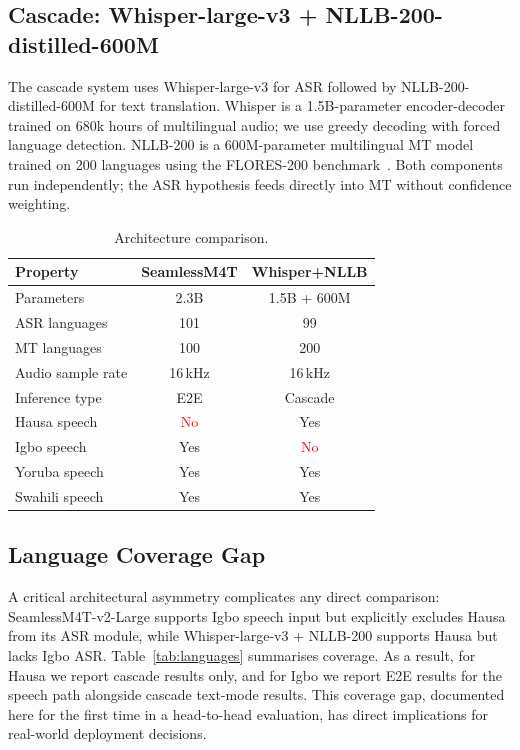 \documentclass[11pt,a4paper]{article}
\newcommand{\modelSM}{SeamlessM4T-v2-Large}
\newcommand{\modelWN}{Whisper-large-v3 + NLLB-200}
\begin{document}
\subsection{Cascade: Whisper-large-v3 + NLLB-200-distilled-600M}
The cascade system uses Whisper-large-v3 for ASR followed by NLLB-200-distilled-600M for text translation. Whisper is a 1.5B-parameter encoder-decoder trained on 680k hours of multilingual audio; we use greedy decoding with forced language detection. NLLB-200 is a 600M-parameter multilingual MT model trained on 200 languages using the FLORES-200 benchmark~\citep{costa-jussa-etal-2022-no}. Both components run independently; the ASR hypothesis feeds directly into MT without confidence weighting.

\begin{table}[t]
\centering
\small
\caption{Architecture comparison.}
\label{tab:arch}
\begin{tabular}{lcc}
\toprule
\textbf{Property} & \textbf{SeamlessM4T} & \textbf{Whisper+NLLB} \\
\midrule
Parameters & 2.3B & 1.5B + 600M \\
ASR languages & 101 & 99 \\
MT languages & 100 & 200 \\
Audio sample rate & 16\,kHz & 16\,kHz \\
Inference type & E2E & Cascade \\
\midrule
Hausa speech & \textcolor{red}{No} & \textcolor{green!60!black}{Yes} \\
Igbo speech & \textcolor{green!60!black}{Yes} & \textcolor{red}{No} \\
Yoruba speech & \textcolor{green!60!black}{Yes} & \textcolor{green!60!black}{Yes} \\
Swahili speech & \textcolor{green!60!black}{Yes} & \textcolor{green!60!black}{Yes} \\
\bottomrule
\end{tabular}
\end{table}

\subsection{Language Coverage Gap}
A critical architectural asymmetry complicates any direct comparison: \modelSM{} supports Igbo speech input but explicitly excludes Hausa from its ASR module, while \modelWN{} supports Hausa but lacks Igbo ASR. Table~\ref{tab:languages} summarises coverage. As a result, for Hausa we report cascade results only, and for Igbo we report E2E results for the speech path alongside cascade text-mode results. This coverage gap, documented here for the first time in a head-to-head evaluation, has direct implications for real-world deployment decisions.
\end{document}
